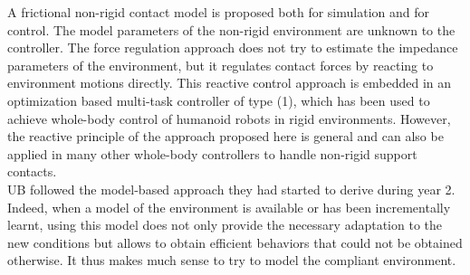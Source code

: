 A frictional non-rigid contact model is proposed both for simulation and for control. The model parameters of the non-rigid environment are unknown to the controller. The force regulation approach does not try to estimate the impedance parameters of the environment, but it regulates contact forces by reacting to environment motions directly. This reactive control approach is embedded in an optimization based multi-task controller of type (1), which has been used to achieve whole-body control of humanoid robots in rigid environments. However, the reactive principle of the approach proposed here is general and can also be applied in many other whole-body controllers to handle non-rigid support contacts.\\ %

UB followed the model-based approach they had started to derive during year 2. Indeed, when a model of the environment is available or has been incrementally learnt, using this model does not only provide the necessary adaptation to the new conditions but allows to obtain efficient behaviors that could not be obtained otherwise. It thus makes much sense to try to model the compliant environment.\\

